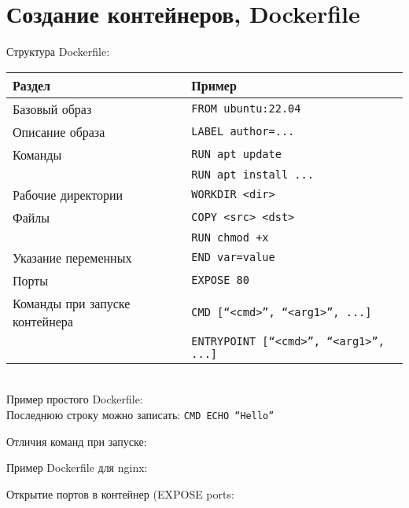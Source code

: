 \section{Создание контейнеров, Dockerfile}

Структура Dockerfile: \\
	\begin{tabular}{| l | l |}
		\hline
		Раздел & Пример \\
		\hline
		Базовый образ & \texttt{FROM ubuntu:22.04} \\
		Описание образа & \texttt{LABEL author=...} \\
		Команды & \texttt{RUN apt update} \\
		  & \texttt{RUN apt install ...} \\
		Рабочие директории & \texttt{WORKDIR <dir>} \\
		Файлы & \texttt{COPY <src> <dst>} \\
		& \texttt{RUN chmod +x} \\
		Указание переменных & \texttt{END var=value} \\
		Порты & \texttt{EXPOSE 80} \\
		Команды при запуске контейнера & \texttt{CMD [``<cmd>'', ``<arg1>'', ...]} \\
		& \texttt{ENTRYPOINT [``<cmd>'', ``<arg1>'', ...]} \\
		\hline
	\end{tabular}
\\

\noindent Пример простого Dockerfile: \\
Последнюю строку можно записать: \texttt{CMD ECHO ``Hello''} \\


\noindent Отличия команд при запуске: \\

\noindent Пример Dockerfile для nginx: \\


\noindent Открытие портов в контейнер (EXPOSE ports: \\
